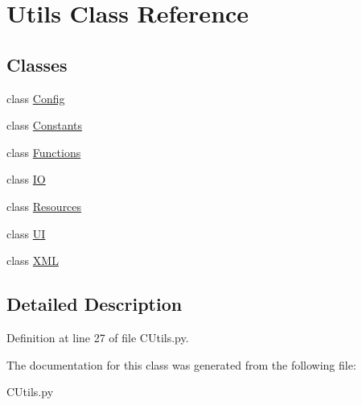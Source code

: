 \hypertarget{class_c_utils_1_1_utils}{}\section{Utils Class Reference}
\label{class_c_utils_1_1_utils}
\subsection*{Classes}
\begin{DoxyCompactItemize}
\item 
class \hyperlink{class_c_utils_1_1_utils_1_1_config}{Config}
\item 
class \hyperlink{class_c_utils_1_1_utils_1_1_constants}{Constants}
\item 
class \hyperlink{class_c_utils_1_1_utils_1_1_functions}{Functions}
\item 
class \hyperlink{class_c_utils_1_1_utils_1_1_i_o}{IO}
\item 
class \hyperlink{class_c_utils_1_1_utils_1_1_resources}{Resources}
\item 
class \hyperlink{class_c_utils_1_1_utils_1_1_u_i}{UI}
\item 
class \hyperlink{class_c_utils_1_1_utils_1_1_x_m_l}{X\+ML}
\end{DoxyCompactItemize}


\subsection{Detailed Description}


Definition at line 27 of file C\+Utils.\+py.



The documentation for this class was generated from the following file\+:\begin{DoxyCompactItemize}
\item 
C\+Utils.\+py\end{DoxyCompactItemize}
